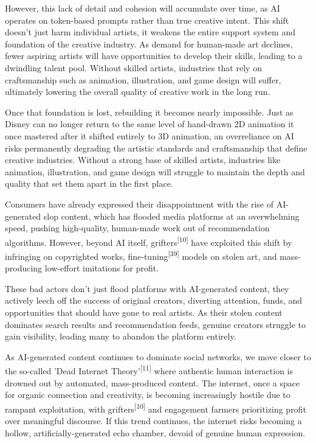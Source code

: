 However, this lack of detail and cohesion will accumulate over time, as AI operates on token-based prompts rather than true creative intent. This shift doesn’t just harm individual artists, it weakens the entire support system and foundation of the creative industry. As demand for human-made art declines, fewer aspiring artists will have opportunities to develop their skills, leading to a dwindling talent pool. Without skilled artists, industries that rely on craftsmanship such as animation, illustration, and game design will suffer, ultimately lowering the overall quality of creative work in the long run.\newline

Once that foundation is lost, rebuilding it becomes nearly impossible. Just as Disney can no longer return to the same level of hand-drawn 2D animation it once mastered after it shifted entirely to 3D animation, an overreliance on AI risks permanently degrading the artistic standards and craftsmanship that define creative industries. Without a strong base of skilled artists, industries like animation, illustration, and game design will struggle to maintain the depth and quality that set them apart in the first place.\newline

Consumers have already expressed their disappointment with the rise of AI-generated slop content, which has flooded media platforms at an overwhelming speed, pushing high-quality, human-made work out of recommendation algorithms. However, beyond AI itself, grifters\textsuperscript{[10]} have exploited this shift by infringing on copyrighted works, fine-tuning\textsuperscript{[39]} models on stolen art, and mass-producing low-effort imitations for profit.\newline

These bad actors don’t just flood platforms with AI-generated content, they actively leech off the success of original creators, diverting attention, funds, and opportunities that should have gone to real artists. As their stolen content dominates search results and recommendation feeds, genuine creators struggle to gain visibility, leading many to abandon the platform entirely.\newline

As AI-generated content continues to dominate social networks, we move closer to the so-called 'Dead Internet Theory'\textsuperscript{[11]} where authentic human interaction is drowned out by automated, mass-produced content. The internet, once a space for organic connection and creativity, is becoming increasingly hostile due to rampant exploitation, with grifters\textsuperscript{[10]} and engagement farmers prioritizing profit over meaningful discourse. If this trend continues, the internet risks becoming a hollow, artificially-generated echo chamber, devoid of genuine human expression.\newline

